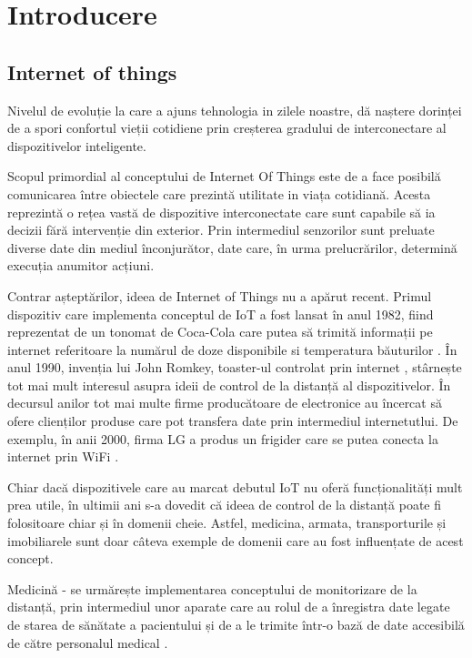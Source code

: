 \chapter{Introducere}\label{ch:1intro}

\section{Internet of things}
	Nivelul de evoluție la care a ajuns tehnologia in zilele noastre, dă naștere dorinței de a spori confortul vieții cotidiene prin creșterea gradului de interconectare al dispozitivelor inteligente.

	Scopul primordial al conceptului de Internet Of Things este de a face posibilă comunicarea între obiectele care prezintă utilitate in viața cotidiană. Acesta reprezintă o rețea vastă de dispozitive interconectate care sunt capabile să ia decizii fără intervenție din exterior. Prin intermediul senzorilor sunt preluate diverse date din mediul înconjurător, date care, în urma prelucrărilor, determină execuția anumitor acțiuni.

	Contrar așteptărilor, ideea de Internet of Things nu a apărut recent. Primul dispozitiv care implementa conceptul de IoT a fost lansat în anul 1982, fiind reprezentat de un tonomat de Coca-Cola care putea să trimită informații pe internet referitoare la numărul de doze disponibile si temperatura băuturilor \cite{cokeMachine}. În anul 1990, invenția lui John Romkey, toaster-ul controlat prin internet \cite{simoniot}, stârnește tot mai mult interesul asupra ideii de control de la distanță al dispozitivelor. În decursul anilor tot mai multe firme producătoare de electronice au încercat să ofere clienților produse care pot transfera date prin intermediul internetutlui. De exemplu, în anii 2000, firma LG a produs un frigider care se putea conecta la internet prin WiFi \cite{simoniot}.

	Chiar dacă dispozitivele care au marcat debutul IoT nu oferă funcționalități mult prea utile, în ultimii ani s-a dovedit că ideea de control de la distanță poate fi folositoare chiar și în domenii cheie. Astfel, medicina, armata, transporturile și imobiliarele sunt doar câteva exemple de domenii care au fost influențate de acest concept.  

	Medicină - se urmărește implementarea conceptului de monitorizare de la distanță, prin intermediul unor aparate care au rolul de a înregistra date legate de starea de sănătate a pacientului și de a le trimite într-o bază de date accesibilă de către personalul medical \cite{medical}.

